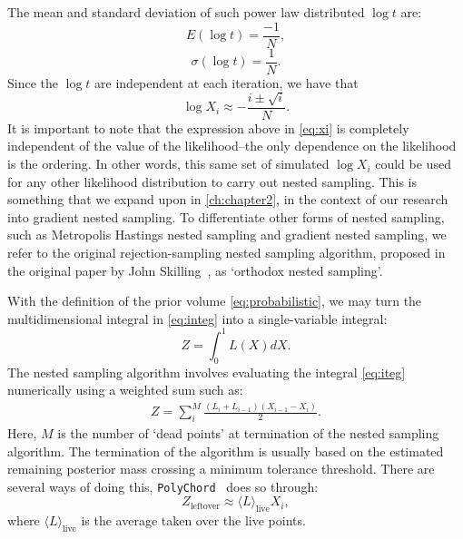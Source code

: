 The mean and standard deviation of such power law distributed $\log t$ are:
%
\begin{equation}
   E(\log t)= \frac{-1}{N},
\end{equation}
%
\begin{equation}
   \sigma (\log t)= \frac{1}{N}.
\end{equation}
%
Since the $\log t$ are independent at each iteration, we have that 
%
\begin{equation}
   \log X_i \approx - \frac{i \pm \sqrt{i}}{N}.
\label{eq:xi}
\end{equation}
%
It is important to note that the expression above in \cref{eq:xi} is completely independent of the value of the likelihood--the only dependence on the likelihood is the ordering. In other words, this same set of simulated $\log X_i$ could be used for any other likelihood distribution to carry out nested sampling. This is something that we expand upon in \cref{ch:chapter2}, in the context of our research into gradient nested sampling. To differentiate other forms of nested sampling, such as Metropolis Hastings nested sampling and gradient nested sampling, we refer to the original rejection-sampling nested sampling algorithm, proposed in the original paper by John Skilling~\cite{10.1214/06-BA127}, as `orthodox nested sampling'. 


With the definition of the prior volume \cref{eq:probabilistic}, we may turn the multidimensional integral in \cref{eq:integ} into a single-variable integral:
%
\begin{equation}
    Z = \int^1_0 L(X) dX.
\label{eq:iteg}
\end{equation}
%
The nested sampling algorithm involves evaluating the integral \cref{eq:iteg} numerically using a weighted sum such as:
%
\begin{align}
Z = \sum_i^M \frac{(L_i+L_{i-1})(X_{i-1}-X_{i})}{2}.
\end{align}
%
Here, $M$ is the number of `dead points' at termination of the nested sampling algorithm. The termination of the algorithm is usually based on the estimated remaining posterior mass crossing a minimum tolerance threshold. There are several ways of doing this, \texttt{PolyChord}~\cite{Handley_2015} does so through:
%
\begin{equation}
    Z_{\mathrm{leftover}} \approx \langle L \rangle_{\mathrm{live}} X_i,
\end{equation}
%
where $\langle L \rangle_{\mathrm{live}}$ is the average taken over the live points. 

